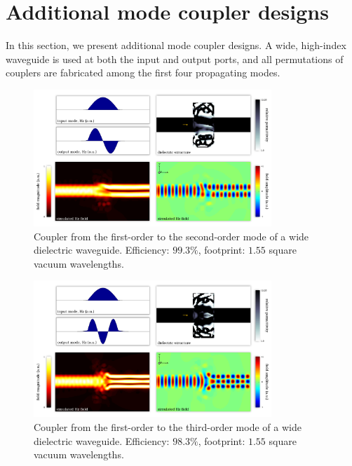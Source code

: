 \section{Additional mode coupler designs}
In this section, we present additional mode coupler designs.
A wide, high-index waveguide is used at both the input and output ports,
    and all permutations of couplers are fabricated among
    the first four propagating modes.
\begin{figure}[h!]
    \centering
    \includegraphics[width=0.8\textwidth]{p3/6}
    \caption{
        Coupler from the first-order to the second-order mode 
            of a wide dielectric waveguide.
        Efficiency: $99.3\%$,
        footprint: $1.55$ square vacuum wavelengths.
        }
\end{figure}
\begin{figure}[h!]
    \centering
    \includegraphics[width=0.8\textwidth]{p3/7}
    \caption{
        Coupler from the first-order to the third-order mode 
            of a wide dielectric waveguide.
        Efficiency: $98.3\%$,
        footprint: $1.55$ square vacuum wavelengths.
        }
\end{figure}
